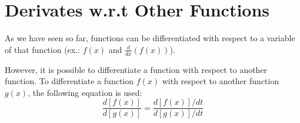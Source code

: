 \section{Derivates w.r.t Other Functions}
As we have seen so far, functions can be differentiated with respect to a
variable of that function (ex.: $f(x)$ and $\frac{d}{dx}(f(x))$).

However, it is possible to differentiate a function with respect to another
function. To differentiate a function $f(x)$ with respect to another function
$g(x)$, the following equation is used:
\begin{equation}
  \frac{d[f(x)]}{d[g(x)]}=\frac{d[f(x)]/dt}{d[g(x)]/dt}
\end{equation}

